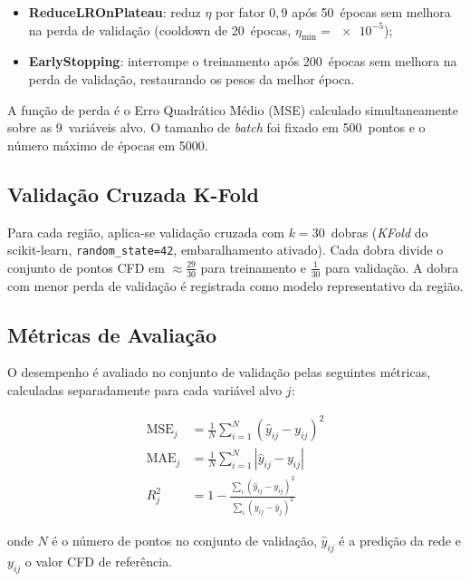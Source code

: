 \documentclass[12pt, a4paper]{article}
\begin{document}
\begin{itemize}
  \item \textbf{ReduceLROnPlateau}: reduz $\eta$ por fator $0{,}9$ após
    50~épocas sem melhora na perda de validação (cooldown de 20~épocas,
    $\eta_{\min} = \num{e-5}$);
  \item \textbf{EarlyStopping}: interrompe o treinamento após 200~épocas sem
    melhora na perda de validação, restaurando os pesos da melhor época.
\end{itemize}

A função de perda é o Erro Quadrático Médio (MSE) calculado
simultaneamente sobre as 9~variáveis alvo.
O tamanho de \textit{batch} foi fixado em 500~pontos e o número máximo de
épocas em \num{5000}.

\subsection{Validação Cruzada K-Fold}
\label{sec:kfold}

Para cada região, aplica-se validação cruzada com $k = 30$~dobras
(\textit{KFold} do scikit-learn, \texttt{random\_state=42}, embaralhamento
ativado). Cada dobra divide o conjunto de pontos CFD em $\approx \frac{29}{30}$
para treinamento e $\frac{1}{30}$ para validação. A dobra com menor perda de
validação é registrada como modelo representativo da região.

\subsection{Métricas de Avaliação}
\label{sec:metricas}

O desempenho é avaliado no conjunto de validação pelas seguintes métricas,
calculadas separadamente para cada variável alvo $j$:

\begin{align}
  \text{MSE}_j  &= \frac{1}{N}\sum_{i=1}^{N}(\hat{y}_{ij} - y_{ij})^2 \\[4pt]
  \text{MAE}_j  &= \frac{1}{N}\sum_{i=1}^{N}|\hat{y}_{ij} - y_{ij}|   \\[4pt]
  R^2_j         &= 1 - \frac{\sum_{i}(\hat{y}_{ij} - y_{ij})^2}
                             {\sum_{i}(y_{ij} - \bar{y}_j)^2}
\end{align}

\noindent onde $N$ é o número de pontos no conjunto de validação,
$\hat{y}_{ij}$ é a predição da rede e $y_{ij}$ o valor CFD de referência.

\end{document}
